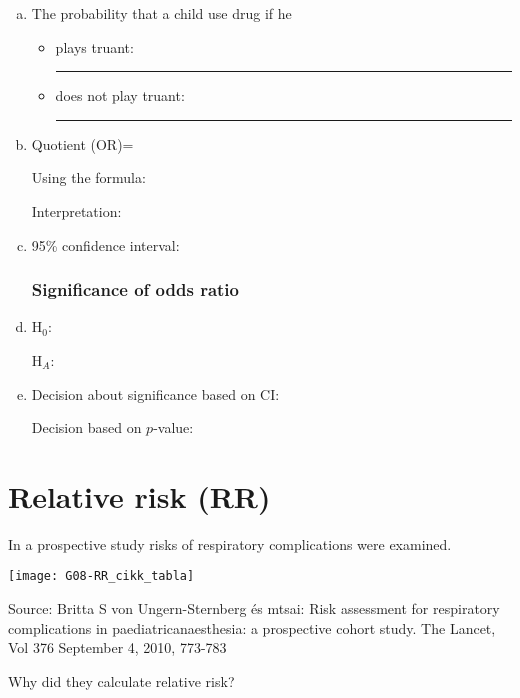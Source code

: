 \begin{enumerate}[a)]
\item The probability that a child use drug if he 
	\begin{itemize}
	\item plays truant:  \rule{5cm}{0.4pt}
	\item does not play truant: \rule{4.2cm}{0.4pt}
	\end{itemize}


\item  Quotient (OR)= \hrulefill

	Using the formula: \hrulefill

	Interpretation: \hrulefill
\item 95\% confidence interval: 	\hrulefill

\subsubsection*{Significance of odds ratio}
	\item H$_0$: \textsc{	\hrulefill}

			 H$_A$: \hrulefill
	\item Decision about significance based on CI: \hrulefill

	Decision based on $p$-value:	\hrulefill
\end{enumerate}




\section{Relative risk (RR)}
In a prospective study risks of respiratory complications were examined.%


\begin{center}
	\texttt{[image: G08-RR\_cikk\_tabla]}
\end{center}
\begin{flushright}
\small
Source: Britta S von Ungern-Sternberg és mtsai: Risk assessment for respiratory complications in paediatricanaesthesia:
a prospective cohort study. The Lancet, Vol 376 September 4, 2010, 773-783
\end{flushright}

\noindent Why did they calculate relative risk? \hrulefill\bigskip



